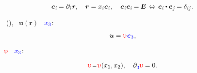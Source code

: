 \begin{equation*}
\bm{e}_i \hspace{-0.2ex} = \partial_i \hspace{.1ex} \locationvector
\hspace{-0.1ex} ,
\hspace{1em}
\locationvector = x_i \bm{e}_i
\hspace{.1ex} ,
\hspace{1em}
\bm{e}_i \bm{e}_i \hspace{-0.2ex} = \hspace{-0.15ex} \UnitDyad
\hspace{.2ex} \Leftrightarrow \hspace{.25ex}
\bm{e}_i \hspace{-0.1ex}
\dotp
\bm{e}_j \hspace{-0.2ex}
= \delta_{i\hspace{-0.1ex}j}
\hspace{.15ex} .
\end{equation*}

~
 (),
~$\bm{u}(\bm{r})$
~$\mathcolor{blue}{x_3}$\::

\begin{equation*}
\bm{u} = \antiplanedisplacement \hspace{.1ex} \mathcolor{blue}{\bm{e}_3}
\hspace{.1ex} ,
\end{equation*}

\noindent
{}~$\antiplanedisplacement$
~$\mathcolor{blue}{x_3}$\::

\begin{equation*}
\antiplanedisplacement \narroweq \antiplanedisplacement(x_1, x_2),
\hspace{1em}
\partial_{\raisemath{-0.15ex}{\mathcolor{blue}{3}}} \antiplanedisplacement \hspace{-0.15ex} = 0
\hspace{.1ex} .
\end{equation*}


